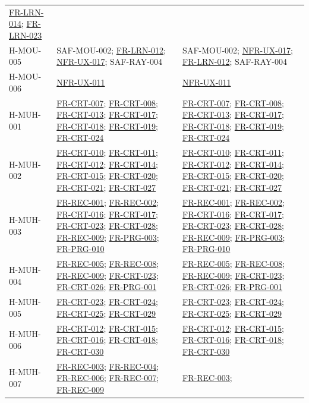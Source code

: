\documentclass[12pt]{article}
\renewcommand{\_}{\textunderscore\allowbreak}%
\newcommand{\reqref}[1]{\hyperref[req:#1]{#1}}
\begin{document}
{\begin{longtable}{@{}>{\raggedright\arraybackslash}p{}
>{\raggedright\arraybackslash}p{}
>{\raggedright\arraybackslash}p{}@{}}
\reqref{FR-LRN-014}; \reqref{FR-LRN-023} \\
\addlinespace
H-MOU-005 & SAF-MOU-002; \reqref{FR-LRN-012}; \reqref{NFR-UX-017}; SAF-RAY-004 &
SAF-MOU-002; \reqref{NFR-UX-017}; \reqref{FR-LRN-012}; SAF-RAY-004 \\
\addlinespace
H-MOU-006 & \reqref{NFR-UX-011} & \reqref{NFR-UX-011} \\
\addlinespace
H-MUH-001 & \reqref{FR-CRT-007}; \reqref{FR-CRT-008}; \reqref{FR-CRT-013};
\reqref{FR-CRT-017}; \reqref{FR-CRT-018}; \reqref{FR-CRT-019};
\reqref{FR-CRT-024} & \reqref{FR-CRT-007}; \reqref{FR-CRT-008};
\reqref{FR-CRT-013}; \reqref{FR-CRT-017}; \reqref{FR-CRT-018};
\reqref{FR-CRT-019}; \reqref{FR-CRT-024} \\
\addlinespace
H-MUH-002 & \reqref{FR-CRT-010}; \reqref{FR-CRT-011}; \reqref{FR-CRT-012};
\reqref{FR-CRT-014}; \reqref{FR-CRT-015}; \reqref{FR-CRT-020};
\reqref{FR-CRT-021}; \reqref{FR-CRT-027} & \reqref{FR-CRT-010};
\reqref{FR-CRT-011}; \reqref{FR-CRT-012}; \reqref{FR-CRT-014};
\reqref{FR-CRT-015}; \reqref{FR-CRT-020}; \reqref{FR-CRT-021};
\reqref{FR-CRT-027} \\
\addlinespace
H-MUH-003 & \reqref{FR-REC-001}; \reqref{FR-REC-002}; \reqref{FR-CRT-016};
\reqref{FR-CRT-017}; \reqref{FR-CRT-023}; \reqref{FR-CRT-028};
\reqref{FR-REC-009}; \reqref{FR-PRG-003}; \reqref{FR-PRG-010} &
\reqref{FR-REC-001}; \reqref{FR-REC-002}; \reqref{FR-CRT-016};
\reqref{FR-CRT-017}; \reqref{FR-CRT-023}; \reqref{FR-CRT-028};
\reqref{FR-REC-009}; \reqref{FR-PRG-003}; \reqref{FR-PRG-010} \\
\addlinespace
H-MUH-004 & \reqref{FR-REC-005}; \reqref{FR-REC-008}; \reqref{FR-REC-009};
\reqref{FR-CRT-023}; \reqref{FR-CRT-026}; \reqref{FR-PRG-001} &
\reqref{FR-REC-005}; \reqref{FR-REC-008}; \reqref{FR-REC-009};
\reqref{FR-CRT-023}; \reqref{FR-CRT-026}; \reqref{FR-PRG-001} \\
\addlinespace
H-MUH-005 & \reqref{FR-CRT-023}; \reqref{FR-CRT-024}; \reqref{FR-CRT-025};
\reqref{FR-CRT-029} & \reqref{FR-CRT-023}; \reqref{FR-CRT-024};
\reqref{FR-CRT-025}; \reqref{FR-CRT-029} \\
\addlinespace
H-MUH-006 & \reqref{FR-CRT-012}; \reqref{FR-CRT-015}; \reqref{FR-CRT-016};
\reqref{FR-CRT-018}; \reqref{FR-CRT-030} & \reqref{FR-CRT-012};
\reqref{FR-CRT-015}; \reqref{FR-CRT-016}; \reqref{FR-CRT-018};
\reqref{FR-CRT-030} \\
\addlinespace
H-MUH-007 & \reqref{FR-REC-003}; \reqref{FR-REC-004}; \reqref{FR-REC-006};
\reqref{FR-REC-007}; \reqref{FR-REC-009} & \reqref{FR-REC-003};

\end{longtable}}
\end{document}
